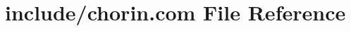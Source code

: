 \hypertarget{home_2abonfi_2_c_f_d__codes_2_eul_f_s_83_84_2include_2chorin_8com}{\section{include/chorin.com File Reference}
\label{home_2abonfi_2_c_f_d__codes_2_eul_f_s_83_84_2include_2chorin_8com}
}
